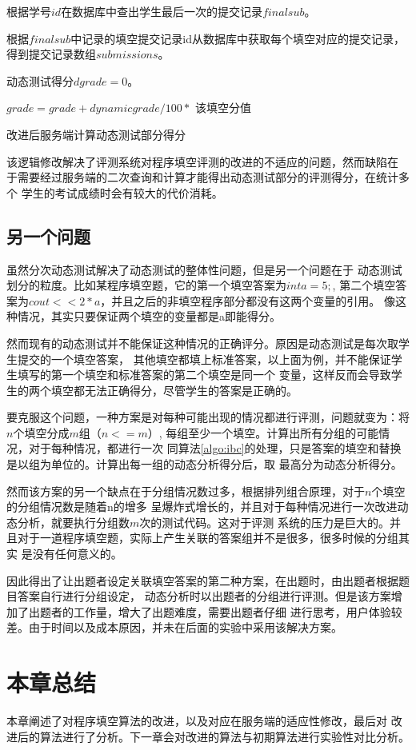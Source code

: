 \begin{algorithm}[h]
根据学号$id$在数据库中查出学生最后一次的提交记录$finalsub$。

根据$finalsub$中记录的填空提交记录id从数据库中获取每个填空对应的提交记录，得到提交记录数组$submissions$。

动态测试得分$dgrade = 0$。

 {
  $grade = grade + dynamicgrade / 100 * $ 该填空分值
}
\caption{改进后服务端计算动态测试部分得分}
\label{algo:cal_grade}
\end{algorithm}

该逻辑修改解决了评测系统对程序填空评测的改进的不适应的问题，然而缺陷在
于需要经过服务端的二次查询和计算才能得出动态测试部分的评测得分，在统计多个
学生的考试成绩时会有较大的代价消耗。

\subsection{另一个问题}
虽然分次动态测试解决了动态测试的整体性问题，但是另一个问题在于
动态测试划分的粒度。比如某程序填空题，它的第一个填空答案为$int a = 5;$,
第二个填空答案为$cout << 2 * a$，并且之后的非填空程序部分都没有这两个变量的引用。
像这种情况，其实只要保证两个填空的变量都是a即能得分。

然而现有的动态测试并不能保证这种情况的正确评分。原因是动态测试是每次取学生提交的一个填空答案，
其他填空都填上标准答案，以上面为例，并不能保证学生填写的第一个填空和标准答案的第二个填空是同一个
变量，这样反而会导致学生的两个填空都无法正确得分，尽管学生的答案是正确的。

要克服这个问题，一种方案是对每种可能出现的情况都进行评测，问题就变为：将$n$个填空分成$m$组（$n <= m$）,
每组至少一个填空。计算出所有分组的可能情况，对于每种情况，都进行一次
同算法\ref{algo:ibc}的处理，只是答案的填空和替换是以组为单位的。计算出每一组的动态分析得分后，取
最高分为动态分析得分。

然而该方案的另一个缺点在于分组情况数过多，根据排列组合原理，对于$n$个填空的分组情况数是随着n的增多
呈爆炸式增长的，并且对于每种情况进行一次改进动态分析，就要执行分组数$m$次的测试代码。这对于评测
系统的压力是巨大的。并且对于一道程序填空题，实际上产生关联的答案组并不是很多，很多时候的分组其实
是没有任何意义的。

因此得出了让出题者设定关联填空答案的第二种方案，在出题时，由出题者根据题目答案自行进行分组设定，
动态分析时以出题者的分组进行评测。但是该方案增加了出题者的工作量，增大了出题难度，需要出题者仔细
进行思考，用户体验较差。由于时间以及成本原因，并未在后面的实验中采用该解决方案。

\section{本章总结}
本章阐述了对程序填空算法的改进，以及对应在服务端的适应性修改，最后对
改进后的算法进行了分析。下一章会对改进的算法与初期算法进行实验性对比分析。

\clearpage
